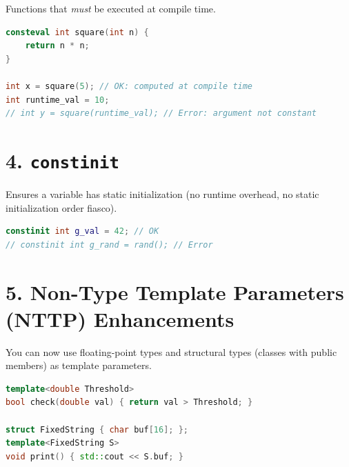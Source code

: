Functions that \emph{must} be executed at compile time.

\begin{lstlisting}[language={C++}]
consteval int square(int n) {
    return n * n;
}

int x = square(5); // OK: computed at compile time
int runtime_val = 10;
// int y = square(runtime_val); // Error: argument not constant
\end{lstlisting}

\hypertarget{constinit}{%
\section{\texorpdfstring{4.
\texttt{constinit}}{4. constinit}}\label{constinit}}

Ensures a variable has static initialization (no runtime overhead, no
static initialization order fiasco).

\begin{lstlisting}[language={C++}]
constinit int g_val = 42; // OK
// constinit int g_rand = rand(); // Error
\end{lstlisting}

\hypertarget{non-type-template-parameters-nttp-enhancements}{%
\section{5. Non-Type Template Parameters (NTTP)
Enhancements}\label{non-type-template-parameters-nttp-enhancements}}

You can now use floating-point types and structural types (classes with
public members) as template parameters.

\begin{lstlisting}[language={C++}]
template<double Threshold>
bool check(double val) { return val > Threshold; }

struct FixedString { char buf[16]; };
template<FixedString S>
void print() { std::cout << S.buf; }
\end{lstlisting}
